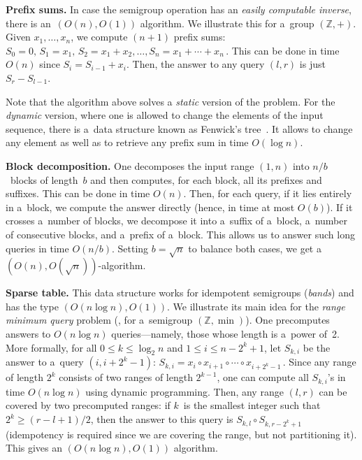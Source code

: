 \textbf{Prefix sums.} In case the semigroup operation has an \emph{easily
    computable inverse}, there is an~$(O(n), O(1))$ algorithm. We
illustrate this for a~group $(\mathbb{Z}, +)$. Given $x_1, \dotsc, x_n$, we
compute $(n+1)$ prefix sums:
\(S_0=0,\, S_1=x_1,\, S_2=x_1+x_2, \dotsc, S_n=x_1+\dotsb+x_n\,.\)
This can be done in time $O(n)$ since $S_i=S_{i-1}+x_i$. Then, the answer to any
query $(l,r)$ is just $S_r-S_{l-1}$.

Note that the algorithm above solves a \emph{static} version of the problem. For
the \emph{dynamic} version, where one is allowed to change the elements of the
input sequence, there is a~data structure known as Fenwick's
tree~\cite{DBLP:journals/spe/Fenwick94}. It allows to change any element as well
as to retrieve any prefix sum in time $O(\log n)$.

\textbf{Block decomposition.} One decomposes the input range $(1,n)$ into
$n/b$~blocks of length~$b$ and then computes, for each block, all its prefixes
and suffixes. This can be done in time $O(n)$. Then, for each query, if it lies
entirely in a~block, we compute the answer directly (hence, in time at most
$O(b)$). If it crosses a~number of blocks, we decompose it into a~suffix of
a~block, a~number of consecutive blocks, and a~prefix of a~block. This allows us
to answer such long queries in time $O(n/b)$. Setting $b=\sqrt{n}$ to balance
both cases, we get a~$(O(n), O(\sqrt{n}))$-algorithm.

\textbf{Sparse table.} This data structure works for idempotent semigroups
(\emph{bands}) and has the type $(O(n\log n), O(1))$. We illustrate its main idea
for the \emph{range minimum query}
problem %
(\ie, for a~semigroup
$(\mathbb{Z}, \min)$). One precomputes answers to $O(n\log n)$ queries---namely,
those whose length is a~power of~2. More formally, for all $0 \le k \le \log_2n$
and $1 \le i \le n-2^k+1$, let $S_{k,i}$ be the answer to a~query $(i, i+2^k-1)$:
\(S_{k,i}=x_i \circ x_{i+1} \circ \dotsb \circ x_{i+2^k-1} \, .\)
Since any range of length $2^k$ consists of two ranges of length $2^{k-1}$, one
can compute all $S_{k,i}$'s in time $O(n\log n)$ using dynamic programming.
Then, any range $(l,r)$ can be covered by two precomputed ranges: if $k$~is the
smallest integer such that $2^k \ge (r-l+1)/2$, then the answer to this query
is $S_{k,l} \circ S_{k,r-2^k+1}$ (idempotency is required since we are covering
the range, but not partitioning it). This gives an $(O(n\log n), O(1))$
algorithm.

